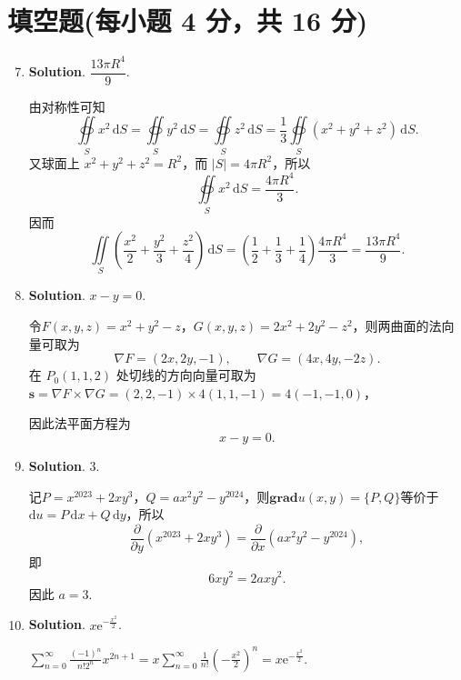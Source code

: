\documentclass[../main.tex]{subfiles}
\begin{document}
\section{填空题(每小题 4 分，共 16 分)}
\begin{enumerate}
    \setcounter{enumi}{6}
    \item \textbf{Solution}. $\dfrac{13\pi R^4}{9}$.

          由对称性可知
          \[
              \oiint\limits_S x^2\,\mathrm{d}S=\oiint\limits_S y^2\,\mathrm{d}S=\oiint\limits_S z^2\,\mathrm{d}S
              =\frac13\oiint\limits_S (x^2+y^2+z^2)\,\mathrm{d}S.
          \]
          又球面上 \(x^2+y^2+z^2=R^2\)，而 \(|S|=4\pi R^2\)，所以
          \[
              \oiint\limits_S x^2\,\mathrm{d}S=\frac{4\pi R^4}{3}.
          \]
          因而
          \[
              \iint\limits_S\left(\frac{x^2}{2}+\frac{y^2}{3}+\frac{z^2}{4}\right)\,\mathrm{d}S
              =\left(\frac12+\frac13+\frac14\right)\frac{4\pi R^4}{3}
              =\frac{13\pi R^4}{9}.
          \]

    \item \textbf{Solution}. $x-y=0$.

          令$F(x,y,z)=x^2+y^2-z$，$G(x,y,z)=2x^2+2y^2-z^2$，则两曲面的法向量可取为
          \[
              \nabla F=(2x,2y,-1),\qquad \nabla G=(4x,4y,-2z).
          \]
          在 \(P_0(1,1,2)\) 处切线的方向向量可取为$\boldsymbol{s}=\nabla F\times\nabla G=(2,2,-1)\times 4(1,1,-1)=4(-1,-1,0)$，

          因此法平面方程为
          \[
              x-y=0.
          \]

    \item \textbf{Solution}. $3$.

          记$P=x^{2023}+2xy^3$，$Q=ax^2y^2-y^{2024}$，则$\mathbf{grad } u(x,y)=\{P,Q\}$等价于$\mathrm{d}u=P\,\mathrm{d}x+Q\,\mathrm{d}y$，所以
          \[
              \frac{\partial}{\partial y}(x^{2023}+2xy^3)
              =\frac{\partial}{\partial x}(ax^2y^2-y^{2024}),
          \]
          即
          \[
              6xy^2=2axy^2.
          \]
          因此 \(a=3\).

    \item \textbf{Solution}. $x\mathrm{e}^{-\frac{x^2}{2}}$.

          $\sum_{n=0}^{\infty}\frac{(-1)^n}{n!2^n}x^{2n+1}=x\sum_{n=0}^{\infty}\frac{1}{n!}\left(-\frac{x^2}{2}\right)^{n}=x\mathrm{e}^{-\frac{x^2}{2}}$.

\end{enumerate}
\end{document}
